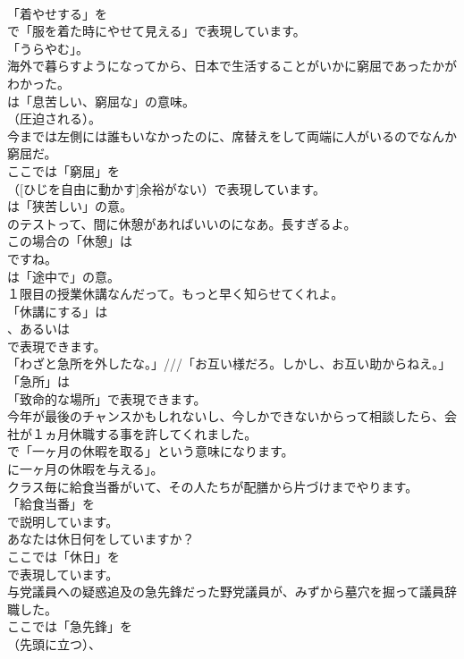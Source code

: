 \documentclass[8pt]{extreport}
\begin{document}
\begin{CJK}{UTF8}{min}
\\	「着やせする」を
\\	で「服を着た時にやせて見える」で表現しています。
\\	「うらやむ」。	
\\	海外で暮らすようになってから、日本で生活することがいかに窮屈であったかがわかった。 
\\	は「息苦しい、窮屈な」の意味。
\\	（圧迫される）。	
\\	今までは左側には誰もいなかったのに、席替えをして両端に人がいるのでなんか窮屈だ。 
\\	ここでは「窮屈」を
\\	（[ひじを自由に動かす]余裕がない）で表現しています。
\\	は「狭苦しい」の意。	
\\	のテストって、間に休憩があればいいのになあ。長すぎるよ。 
\\	この場合の「休憩」は
\\	ですね。
\\	は「途中で」の意。	
\\	１限目の授業休講なんだって。もっと早く知らせてくれよ。 
\\	「休講にする」は 
\\	、あるいは 
\\	で表現できます。	
\\	「わざと急所を外したな。」///「お互い様だろ。しかし、お互い助からねえ。」 
\\	「急所」は
\\	「致命的な場所」で表現できます。	
\\	今年が最後のチャンスかもしれないし、今しかできないからって相談したら、会社が１ヵ月休職する事を許してくれました。 
\\	で「一ヶ月の休暇を取る」という意味になります。
\\	に一ヶ月の休暇を与える」。	
\\	クラス毎に給食当番がいて、その人たちが配膳から片づけまでやります。 
\\	「給食当番」を
\\	で説明しています。	
\\	あなたは休日何をしていますか？ 
\\	ここでは「休日」を 
\\	で表現しています。	
\\	与党議員への疑惑追及の急先鋒だった野党議員が、みずから墓穴を掘って議員辞職した。 
\\	ここでは「急先鋒」を 
\\	（先頭に立つ）、

\end{CJK}
\end{document}
